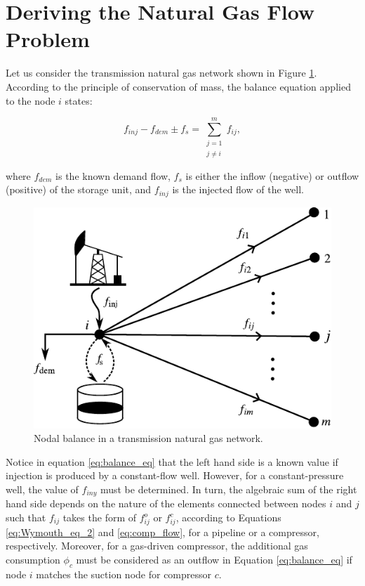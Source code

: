 \section{Deriving the Natural Gas Flow Problem}
\label{sec:NGF_problem}

Let us consider the transmission natural gas network shown in Figure \ref{fig:nodal_balance}. According to the principle of conservation of mass, the balance equation applied to the node $i$ states:

\begin{equation}
	\label{eq:balance_eq}
	f_{inj} - f_{dem} \pm f_s = \sum_{\substack{j=1 \\ j \neq i}}^{m} f_{ij},
\end{equation}

where $f_{dem}$ is the known demand flow, $f_s$ is either the  inflow (negative) or outflow (positive) of the storage unit, and $f_{inj}$ is the injected flow of the well. 

\begin{figure}[!ht]
	\centering
	\includegraphics[scale=0.95]{Figures/Gas_flow_problem}
	\caption{Nodal balance in a transmission natural gas network.}	
	\label{fig:nodal_balance}
\end{figure}

Notice in equation \ref{eq:balance_eq} that the left hand side is a known value if injection is produced by a constant-flow well. However, for a constant-pressure well, the value of $f_{iny}$ must be determined. In turn, the algebraic sum of the right hand side depends on the nature of the elements connected between nodes $i$ and $j$ such that $f_{ij}$ takes the form of $f_{ij}^o$ or $f_{ij}^c$, according to Equations \ref{eq:Wymouth_eq_2} and \ref{eq:comp_flow}, for a pipeline or a compressor, respectively. Moreover, for a gas-driven compressor, the additional gas consumption $\phi_c$ must be considered as an outflow in Equation \ref{eq:balance_eq} if node $i$ matches the suction node for compressor $c$.

